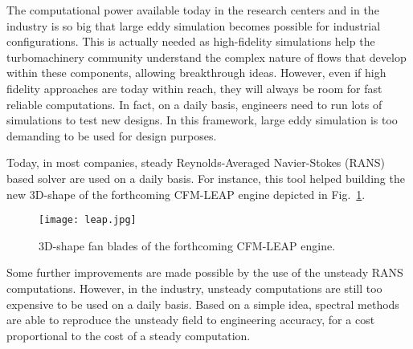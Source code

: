 
The computational power available today in
the research centers and in the industry
is so big that large eddy simulation
becomes possible for industrial configurations.
This is actually needed as high-fidelity
simulations help the turbomachinery community understand
the complex nature of flows that develop 
within these components,
allowing breakthrough ideas.
However, even if high fidelity approaches
are today within reach,
they will always be room for fast reliable
computations. 
In fact, on a daily basis, engineers need
to run lots of simulations to test new designs.
In this framework, large eddy simulation is
too demanding to be used for design purposes.

Today, in most companies, steady Reynolds-Averaged
Navier-Stokes (RANS) based solver are used on a daily basis.
For instance, this tool 
helped building the new $3$D-shape
of the forthcoming CFM-LEAP engine
depicted in Fig.~\ref{fig:sm_leap}.
\begin{figure}[htbp]
  \centering
  \texttt{[image: leap.jpg]}
  \caption{$3$D-shape fan blades of the forthcoming CFM-LEAP engine.}
  \label{fig:sm_leap}
\end{figure}
Some further improvements are made possible by the use
of the unsteady RANS computations.
However, in the industry, unsteady computations
are still too expensive to be used on a daily basis.
Based on a simple idea, spectral methods are 
able to reproduce the unsteady field to engineering
accuracy, for a cost proportional to the cost of a
steady computation.

